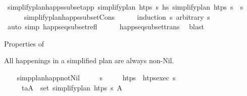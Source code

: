 \begin{isabellebody}
\ simplify{\isacharunderscore}{\kern0pt}plan{\isacharunderscore}{\kern0pt}happs{\isacharunderscore}{\kern0pt}subset{\isacharunderscore}{\kern0pt}app{\isacharcolon}{\kern0pt}\ {\isachardoublequoteopen}simplify{\isacharunderscore}{\kern0pt}plan\ htps\ {\isasympi}s\ {\isasymsubseteq}\isactrlsub h\isactrlsub s\ simplify{\isacharunderscore}{\kern0pt}plan\ htps\ {\isacharparenleft}{\kern0pt}{\isasympi}s\ {\isacharat}{\kern0pt}\ {\isasympi}s\isanewline
%
\isadelimproof
\ \ \ \ %
\endisadelimproof
%
\isatagproof
{}\isamarkupfalse%
\ simplify{\isacharunderscore}{\kern0pt}plan{\isacharunderscore}{\kern0pt}happs{\isacharunderscore}{\kern0pt}subset{\isacharunderscore}{\kern0pt}Cons\isanewline
\ \ \ \ \isamarkupfalse%
\ {\isacharparenleft}{\kern0pt}induction\ {\isasympi}s\ arbitrary{\isacharcolon}{\kern0pt}\ {\isasympi}s\isanewline
\ \ \ \ \isamarkupfalse%
\ {\isacharparenleft}{\kern0pt}auto\ simp{\isacharcolon}{\kern0pt}\ happ{\isacharunderscore}{\kern0pt}seq{\isacharunderscore}{\kern0pt}subset{\isacharunderscore}{\kern0pt}refl{\isacharparenright}{\kern0pt}\isanewline
\ \ \ \ \isamarkupfalse%
\ happ{\isacharunderscore}{\kern0pt}seq{\isacharunderscore}{\kern0pt}subset{\isacharunderscore}{\kern0pt}trans\ \isamarkupfalse%
\ blast\isanewline
\ \ \ \ \isamarkupfalse%
%
\endisatagproof
{\isafoldproof}%
%
\isadelimproof
%
\endisadelimproof
%
\begin{isamarkuptext}%
Properties of %
\end{isamarkuptext}\isamarkuptrue%
%
\begin{isamarkuptext}%
All happenings in a simplified plan are always non-Nil.%
\end{isamarkuptext}\isamarkuptrue%
\ \ \isamarkupfalse%
\ simp{\isacharunderscore}{\kern0pt}plan{\isacharunderscore}{\kern0pt}happ{\isacharunderscore}{\kern0pt}not{\isacharunderscore}{\kern0pt}Nil{\isacharcolon}{\kern0pt}\isanewline
\ \ \ \ \ {\isasympi}s\isanewline
\ \ \ \ \ {\isachardoublequoteopen}htps\ {\isasymequiv}\ htps{\isacharunderscore}{\kern0pt}exec\ {\isasympi}s{\isachardoublequoteclose}\isanewline
\ \ \ \ \ {\isachardoublequoteopen}{\isasymforall}{\isacharparenleft}{\kern0pt}t\isactrlsub a{\isacharcomma}{\kern0pt}A{\isacharparenright}{\kern0pt}\ {\isasymin}\ set\ {\isacharparenleft}{\kern0pt}simplify{\isacharunderscore}{\kern0pt}plan\ htps\ {\isasympi}s{\isacharparenright}{\kern0pt}{\isachardot}{\kern0pt}\ A\ {\isasymnoteq}\ {\isacharbrackleft}{\kern0pt}{\isacharbrackright}{\kern0pt}{\isachardoublequoteclose}\isanewline

\end{isabellebody}

